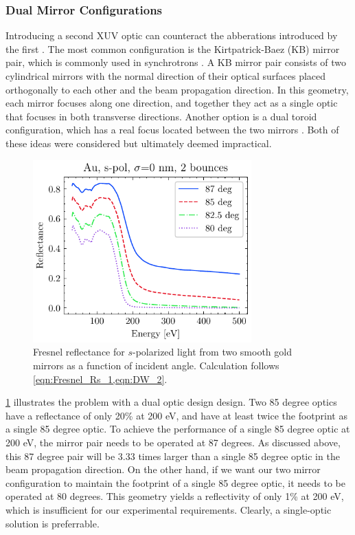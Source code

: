 \subsubsection{Dual Mirror Configurations}

Introducing a second XUV optic can counteract the abberations introduced by the first \cite{howellsMirrorsSynchrotronRadiationBeamlines1994}. The most common configuration is the Kirtpatrick-Baez (KB) mirror pair, which is commonly used in synchrotrons \cite{kirkpatrickFormationOpticalImages1948}. A KB mirror pair consists of two cylindrical mirrors with the normal direction of their optical surfaces placed orthogonally to each other and the beam propagation direction. In this geometry, each mirror focuses along one direction, and together they act as a single optic that focuses in both transverse directions. Another option is a dual toroid configuration, which has a real focus located between the two mirrors \cite{polettoMicrofocusingAttosecondPulses2013}. Both of these ideas were considered but ultimately deemed impractical.

\begin{figure}
	\centering
	\includegraphics[width=0.75\textwidth]{figures/chap2/Au_ReflvsAngle_2bounce.pdf}
	\caption{Fresnel reflectance for $s$-polarized light from two smooth gold mirrors as a function of incident angle. Calculation follows \cref{eqn:Fresnel_Rs_1,eqn:DW_2}.}
	\label{fig:Au_ReflvsAngle_2bounce}
\end{figure}

\cref{fig:Au_ReflvsAngle_2bounce} illustrates the problem with a dual optic design design. Two 85 degree optics have a reflectance of only 20\% at 200 eV, and have at least twice the footprint as a single 85 degree optic. To achieve the performance of a single 85 degree optic at 200 eV, the mirror pair needs to be operated at 87 degrees. As discussed above, this 87 degree pair will be 3.33 times larger than a single 85 degree optic in the beam propagation direction. On the other hand, if we want our two mirror configuration to maintain the footprint of a single 85 degree optic, it needs to be operated at 80 degrees. This geometry yields a reflectivity of only 1\% at 200 eV, which is insufficient for our experimental requirements. Clearly, a single-optic solution is preferrable.

